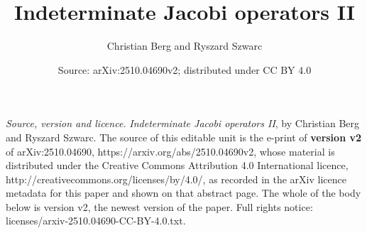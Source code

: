 \documentclass[10pt,a4paper]{amsart}
\begin{document}
\title{Indeterminate Jacobi operators II}
\author{Christian Berg and Ryszard Szwarc}
\date{Source: arXiv:2510.04690v2; distributed under CC BY 4.0}
\maketitle
\noindent\emph{Source, version and licence.} \emph{Indeterminate Jacobi operators II}, by Christian Berg and Ryszard Szwarc. The source of this editable unit is the e-print of \textbf{version v2} of arXiv:2510.04690, https://arxiv.org/abs/2510.04690v2, whose material is distributed under the Creative Commons Attribution 4.0 International licence, http://creativecommons.org/licenses/by/4.0/, as recorded in the arXiv licence metadata for this paper and shown on that abstract page. The whole of the body below is version v2, the newest version of the paper. Full rights notice: licenses/arxiv-2510.04690-CC-BY-4.0.txt.\par\smallskip
\end{document}
